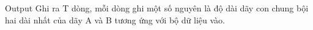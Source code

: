 Output
Ghi ra T dòng, mỗi dòng ghi một số nguyên là độ dài dãy con chung bội hai dài nhất của dãy A và B tương ứng với bộ dữ liệu vào.